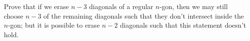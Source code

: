 Prove that if we erase $n-3$ diagonals of a regular $n$-gon, then we may still choose $n-3$ of the remaining diagonals such that they don't intersect inside the $n$-gon; but it is possible to erase $n-2$ diagonals such that this statement doesn't hold.